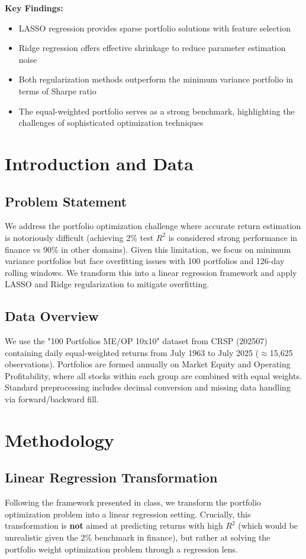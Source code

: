 \documentclass[12pt]{article}
\begin{document}
\textbf{Key Findings:}
\begin{itemize}
    \item LASSO regression provides sparse portfolio solutions with feature selection
    \item Ridge regression offers effective shrinkage to reduce parameter estimation noise
    \item Both regularization methods outperform the minimum variance portfolio in terms of Sharpe ratio
    \item The equal-weighted portfolio serves as a strong benchmark, highlighting the challenges of sophisticated optimization techniques
\end{itemize}

\section{Introduction and Data}

\subsection{Problem Statement}
We address the portfolio optimization challenge where accurate return estimation is notoriously difficult (achieving 2\% test $R^2$ is considered strong performance in finance vs 90\% in other domains). Given this limitation, we focus on minimum variance portfolios but face overfitting issues with 100 portfolios and 126-day rolling windows. We transform this into a linear regression framework and apply LASSO and Ridge regularization to mitigate overfitting.

\subsection{Data Overview}
We use the "100 Portfolios ME/OP 10x10" dataset from CRSP (202507) containing daily equal-weighted returns from July 1963 to July 2025 ($\approx$15,625 observations). Portfolios are formed annually on Market Equity and Operating Profitability, where all stocks within each group are combined with equal weights. Standard preprocessing includes decimal conversion and missing data handling via forward/backward fill.

\section{Methodology}

\subsection{Linear Regression Transformation}
Following the framework presented in class, we transform the portfolio optimization problem into a linear regression setting. Crucially, this transformation is \textbf{not} aimed at predicting returns with high $R^2$ (which would be unrealistic given the 2\% benchmark in finance), but rather at solving the portfolio weight optimization problem through a regression lens.
\end{document}
